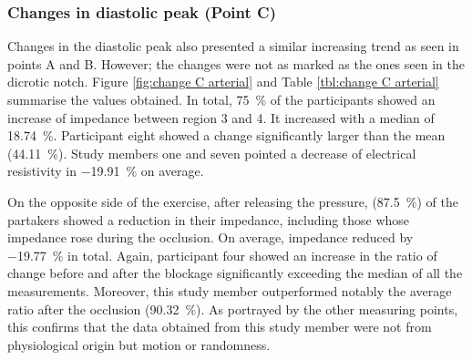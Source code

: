 \subsubsection{Changes in diastolic peak (Point C)}
\label{section apa 2.2.3}
Changes in the diastolic peak also presented a similar increasing trend as seen in points A and B. However; the changes were not as marked as the ones seen in the dicrotic notch. Figure \ref{fig:change C arterial} and Table \ref{tbl:change C arterial} summarise the values obtained. In total, \SI{75}{\percent} of the participants showed an increase of impedance between region 3 and 4. It increased with a median of \SI{18.74}{\percent}. Participant eight showed a change significantly larger than the mean (\SI{44.11}{\percent}). Study members one and seven pointed a decrease of electrical resistivity in \SI{-19.91}{\percent} on average.

On the opposite side of the exercise, after releasing the pressure, (\SI{87.5}{\percent}) of the partakers showed a reduction in their impedance, including those whose impedance rose during the occlusion. On average, impedance reduced by \SI{-19.77}{\percent} in total. Again, participant four showed an increase in the ratio of change before and after the blockage significantly exceeding the median of all the measurements. Moreover, this study member outperformed notably the average ratio after the occlusion (\SI{90.32}{\percent}). As portrayed by the other measuring points, this confirms that the data obtained from this study member were not from physiological origin but motion or randomness.

